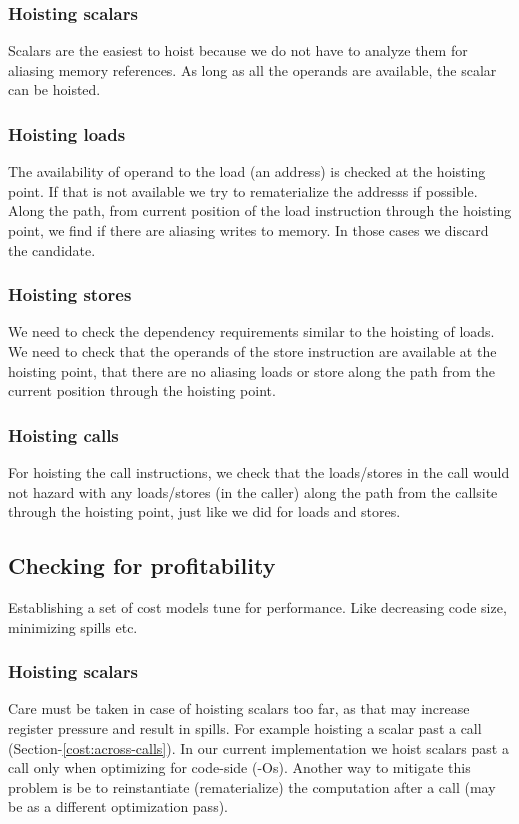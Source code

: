 \documentclass{sig-alternate}
\begin{document}
\subsubsection{Hoisting scalars}
Scalars are the easiest to hoist because we do not have to analyze them for
aliasing memory references. As long as all the operands are available, the
scalar can be hoisted.

\subsubsection{Hoisting loads}
The availability of operand to the load (an address) is checked at the hoisting
point. If that is not available we try to rematerialize the addresss if
possible.  Along the path, from current position of the load instruction through
the hoisting point, we find if there are aliasing writes to memory. In those
cases we discard the candidate.

\subsubsection{Hoisting stores}
We need to check the dependency requirements similar to the hoisting of
loads. We need to check that the operands of the store instruction are available
at the hoisting point, that there are no aliasing loads or store along the path
from the current position through the hoisting point.

\subsubsection{Hoisting calls}
For hoisting the call instructions, we check that the loads/stores in the call
would not hazard with any loads/stores (in the caller) along the path from the
callsite through the hoisting point, just like we did for loads and stores.

\subsection{Checking for profitability}
\label{subsec:profitability}
Establishing a set of cost models tune for performance. Like decreasing code
size, minimizing spills etc.

\subsubsection{Hoisting scalars}
Care must be taken in case of hoisting scalars too far, as that may increase
register pressure and result in spills. For example hoisting a scalar past a
call (Section-\ref{cost:across-calls}). In our current implementation we hoist
scalars past a call only when optimizing for code-side (-Os). Another way to
mitigate this problem is be to reinstantiate (rematerialize) the computation
after a call (may be as a different optimization pass).
\end{document}
